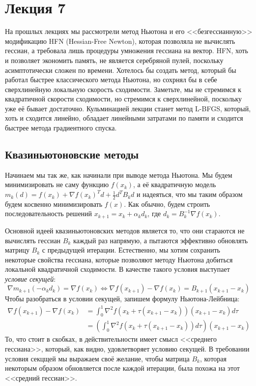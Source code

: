 \documentclass[a4paper, 12pt]{article}
\begin{document}
\section{Лекция 7}
На прошлых лекциях мы рассмотрели метод Ньютона и его <<безгессианную>> модификацию HFN (Hessian-Free Newton), которая позволяла не вычислять гессиан, а требовала лишь процедуры умножения гессиана на вектор. HFN, хоть и позволяет экономить память, не является серебряной пулей, поскольку асимптотически сложен по времени. Хотелось бы создать метод, который бы работал быстрее классического метода Ньютона, но сохрнял бы в себе сверхлинейную локальную скорость сходимости. Заметьте, мы не стремимся к квадратичной скорости сходимости, но стремимся к сверхлинейной, поскольку уже её бывает достаточно. Кульминацией лекции станет метод L-BFGS, который, хоть и сходится линейно, обладает линейными затратами по памяти и сходится быстрее метода градиентного спуска.

\subsection{Квазиньютоновские методы}
Начинаем мы так же, как начинали при выводе метода Ньютона. Мы будем минимизировать не саму функцию $f(x_k)$, а её квадратичную модель $m_k(d) = f(x_k) + \nabla f(x_k)^T d + \frac{1}{2} d^T B_k d$ и надеяться, что мы таким образом будем косвенно минимизировать $f(x)$. Как обычно, будем строить последовательность решений $x_{k+1} = x_k + \alpha_k d_k$, где $d_k = B_k^{-1}\nabla f(x_k)$.

Основной идеей квазиньютоновских методов является то, что они стараются не вычислять гессиан $B_k$ каждый раз напрямую, а пытаются эффективно обновлять матрицу $B_k$ с предыдущей итерации. Естественно, мы хотим сохранить некоторые свойства гессиана, которые позволяют методу Ньютона добиться локальной квадратичной сходимости. В качестве такого условия выступает \textit{условие секущей}:
$$\nabla m_{k+1}(-\alpha_kd_k) = \nabla f(x_k) \Leftrightarrow \nabla f(x_{k+1}) - \nabla f(x_k) = B_{k+1}(x_{k+1} - x_k)$$
Чтобы разобраться в условии секущей, запишем формулу Ньютона-Лейбница:
\begin{align}\nabla f(x_{k+1}) - \nabla f(x_k) &= \int_{0}^{1} \nabla^2 f(x_k + \tau (x_{k+1} - x_k)) (x_{k+1} - x_k) d\tau \\  &= \left(\int_{0}^{1} \nabla^2 f(x_k + \tau (x_{k+1} - x_k))  d\tau\right)(x_{k+1} - x_k)\end{align}
То, что стоит в скобках, в действительности имеет смысл <<среднего гессиана>>, который, как видно, удовлетворяет условию секущей. В требовании условия секцщей мы выражаем своё желание, чтобы матрица $B_k$, которая некоторым образом обновляется после каждой итерации, была похожа на этот <<средний гессиан>>.
\end{document}
